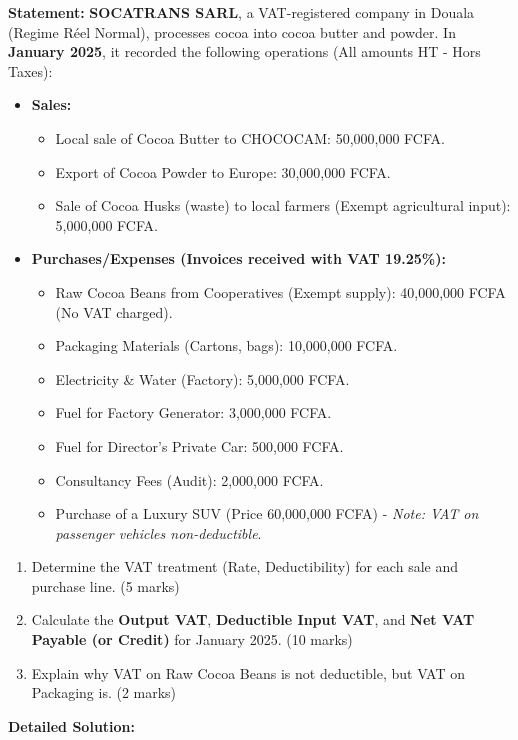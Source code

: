 \documentclass[11pt]{article}
\begin{document}
\begin{exoresolu}
\textbf{Statement:}
\textbf{SOCATRANS SARL}, a VAT-registered company in Douala (Regime Réel Normal), processes cocoa into cocoa butter and powder. In \textbf{January 2025}, it recorded the following operations (All amounts HT - Hors Taxes):
\begin{itemize}
    \item \textbf{Sales:}
    \begin{itemize}
        \item Local sale of Cocoa Butter to CHOCOCAM: 50,000,000 FCFA.
        \item Export of Cocoa Powder to Europe: 30,000,000 FCFA.
        \item Sale of Cocoa Husks (waste) to local farmers (Exempt agricultural input): 5,000,000 FCFA.
    \end{itemize}
    \item \textbf{Purchases/Expenses (Invoices received with VAT 19.25\%):}
    \begin{itemize}
        \item Raw Cocoa Beans from Cooperatives (Exempt supply): 40,000,000 FCFA (No VAT charged).
        \item Packaging Materials (Cartons, bags): 10,000,000 FCFA.
        \item Electricity \& Water (Factory): 5,000,000 FCFA.
        \item Fuel for Factory Generator: 3,000,000 FCFA.
        \item Fuel for Director's Private Car: 500,000 FCFA.
        \item Consultancy Fees (Audit): 2,000,000 FCFA.
        \item Purchase of a Luxury SUV (Price 60,000,000 FCFA) - \textit{Note: VAT on passenger vehicles non-deductible}.
    \end{itemize}
\end{itemize}
\begin{enumerate}
    \item Determine the VAT treatment (Rate, Deductibility) for each sale and purchase line. (5 marks)
    \item Calculate the \textbf{Output VAT}, \textbf{Deductible Input VAT}, and \textbf{Net VAT Payable (or Credit)} for January 2025. (10 marks)
    \item Explain why VAT on Raw Cocoa Beans is not deductible, but VAT on Packaging is. (2 marks)
\end{enumerate}
\tcblower
\textbf{Detailed Solution:}


\end{exoresolu}
\end{document}
